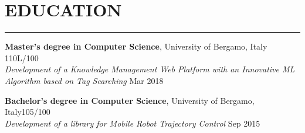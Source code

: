 \documentclass[10pt]{article}
\newcommand{\cvsection}[1]{\section*{\centering\normalsize\uppercase{#1}}\vspace{-16pt}\rule{\linewidth}{0.2pt}\vspace{6pt}}
\begin{document}
\cvsection{education}
\textbf{Master's degree in Computer Science}, University of Bergamo, Italy \hfill 110L\slash100 \\
\textit{Development of a Knowledge Management Web Platform with an Innovative ML Algorithm based on Tag Searching} \hfill Mar 2018

\vspace{6pt} %

\textbf{Bachelor's degree in Computer Science}, University of Bergamo, Italy\hfill 105\slash100 \\
\textit{Development of a library for Mobile Robot Trajectory Control} \hfill Sep 2015

\end{document}
